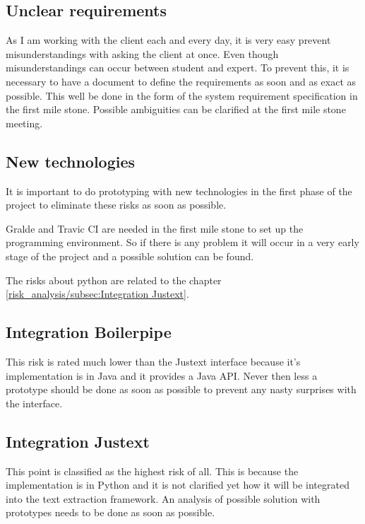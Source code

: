 \subsection{Unclear requirements}

As I am working with the client each and every day, it is very easy prevent misunderstandings with asking the client at once. Even though misunderstandings can occur between student and expert. To prevent this, it is necessary to have a document to define the requirements as soon and as exact as possible. This well be done in the form of the system requirement specification in the first mile stone. Possible ambiguities can be clarified at the first mile stone meeting.

\subsection{New technologies}

It is important to do prototyping with new technologies in the first phase of the project to eliminate these risks as soon as possible.

Gralde and Travic CI are needed in the first mile stone to set up the programming environment. So if there is any problem it will occur in a very early stage of the project and a possible solution can be found.

The risks about python are related to the chapter \ref{risk_analysis/subsec:Integration Justext}.

\subsection{Integration Boilerpipe}

This risk is rated much lower than the Justext interface because it's implementation is in Java and it provides a Java API. Never then less a prototype should be done as soon as possible to prevent any nasty surprises with the interface.

\subsection{Integration Justext}
\label{subsec:Integration Justext}

This point is classified as the highest risk of all. This is because the implementation is in Python and it is not clarified yet how it will be integrated into the text extraction framework. An analysis of possible solution with prototypes needs to be done as soon as possible.

